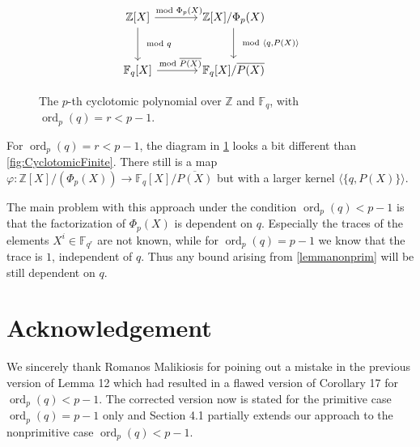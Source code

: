 \documentclass[a4paper]{article}
\newcommand{\Z}{\ensuremath{\mathbb{Z}}}
\newcommand{\F}{\mathbb{F}}
\newcommand{\ord}{\operatorname{ord}}
\numberwithin{equation}{section}
\numberwithin{table}{section}
\numberwithin{figure}{section}
\begin{document}
\begin{figure}[b]
    \centering
        \[\begin{tikzcd}[row sep=large, column sep=large]
            \Z[X] \arrow{r}{ \mod \Phi_p(X)} \arrow{d}{\mod q}  &    \Z[X]/\Phi_p(X) \arrow{d}{\mod \langle q ,P(X)\rangle} \\
             \F_q[X] \arrow{r}{\mod \overline{P(X)}}  & \F_q[X]/\overline{P(X)}
            \end{tikzcd}
        \]
    \caption{The $p$-th cyclotomic polynomial over $\Z$ and $\F_q$, with $\ord_p(q)=r<p-1$.}
    \label{fig:CyclotomicFiniteSmallOrder}
\end{figure}

For $\ord_p(q)=r<p-1$, the diagram in \cref{fig:CyclotomicFiniteSmallOrder} looks a bit different than \cref{fig:CyclotomicFinite}. There still is a map $\varphi \colon \Z[X]/(\Phi_p(X)) \to \F_q[X]/\overline{P(X)}$ but with a larger kernel $\langle \{q,P(X)\}\rangle$.

The main problem with this approach under the condition $\ord_p(q)<p-1$ is that
the factorization of $\Phi_p(X)$ is dependent on $q$. Especially the traces of the elements $X^i \in \F_{q^r}$ are not known, while for $\ord_p(q)=p-1$ we know that the trace is $1$, independent of $q$. Thus any bound arising from \cref{lemmanonprim} will be still dependent on $q$.





\section*{Acknowledgement}
We sincerely thank Romanos Malikiosis for poining out a mistake in the previous version of Lemma 12 which had resulted in a flawed version of Corollary 17 for $\ord_p(q)<p-1$. The corrected version now is stated for the primitive case $\ord_p(q)=p-1$ only and Section 4.1 partially extends our approach to the nonprimitive case $\ord_p(q)<p-1$.

%
%
%



\end{document}
